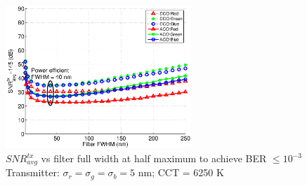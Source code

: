 \begin{figure}[!t]
	\centering
		\includegraphics[trim={0.15in 0.05in 0.05in 0.35in}, clip=true, width=2.75in]{img/SNRvsFLTWID.eps}
	\caption{$SNR_{avg}^{tx}$ vs filter full width at half maximum to achieve BER $\leq 10^{-3}$\newline Transmitter: $\sigma_r = \sigma_g = \sigma_b = 5$ nm; CCT = 6250 K}
	\label{fig:SNRvsFLTWID}
\end{figure}










